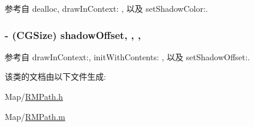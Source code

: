 参考自 dealloc, draw\-In\-Context\-: , 以及 set\-Shadow\-Color\-:.

\hypertarget{interface_r_m_path_ad0a770fb5c74fc7bb09b2d15a642fac5}{
\subsubsection[{shadow\-Offset}]{\setlength{\rightskip}{0pt plus 5cm}-\/ (C\-G\-Size) shadow\-Offset\hspace{0.3cm}{\ttfamily [read]}, {\ttfamily [write]}, {\ttfamily [nonatomic]}, {\ttfamily [assign]}}}\label{interface_r_m_path_ad0a770fb5c74fc7bb09b2d15a642fac5}


参考自 draw\-In\-Context\-:, init\-With\-Contents\-: , 以及 set\-Shadow\-Offset\-:.



该类的文档由以下文件生成\-:\begin{DoxyCompactItemize}
\item 
Map/\hyperlink{_r_m_path_8h}{R\-M\-Path.\-h}\item 
Map/\hyperlink{_r_m_path_8m}{R\-M\-Path.\-m}\end{DoxyCompactItemize}
